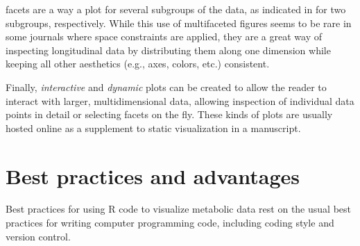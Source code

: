 \documentclass[AMA,LATO1COL]{WileyNJD-v2}
\begin{document}
 facets  are a way  a plot for
several  subgroups of the data, as indicated in
 for two subgroups, respectively. While this use of
multifaceted figures seems to be rare in some journals where space constraints
are applied, they are a great way of inspecting longitudinal data by
distributing them along one dimension while keeping all other aesthetics (e.g.,
axes, colors, etc.) consistent.

Finally, \textit{interactive} and \textit{dynamic} plots can be created to allow
the reader to interact with larger, multidimensional data, allowing inspection
of individual data points in detail or selecting facets on the fly. These kinds
of plots are usually hosted online as a supplement to static visualization in a
manuscript.



\section{Best practices and advantages}

Best practices for using R code to visualize metabolic data rest on the usual
best practices for writing computer programming code, including coding style and
version control.
\end{document}
